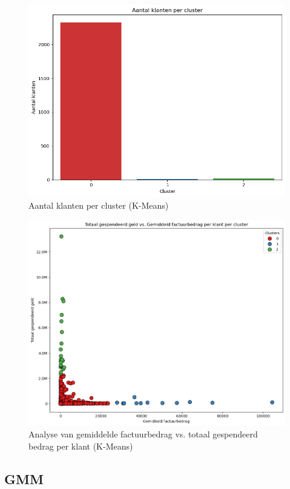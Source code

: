 \begin{figure}[H]
    \centering
    \includegraphics[width=0.8\linewidth]{images/Kmeans/AantalKlantenKMeans}
    \caption{Aantal klanten per cluster (K-Means)}
    \label{fig:Klanten_KMeans}
\end{figure}

\begin{figure}[H]
    \centering
    \includegraphics[width=0.8\linewidth]{images/Kmeans/KMeansClusterAnalyse}
    \caption{Analyse van gemiddelde factuurbedrag vs. totaal gespendeerd bedrag per klant (K-Means)}
    \label{fig:Analyse_KMeans}
\end{figure}

\subsection*{GMM}

